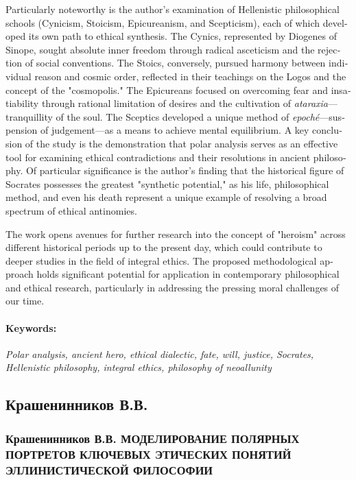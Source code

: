 \begin{english}
    Particularly noteworthy is the author's examination of Hellenistic philosophical schools (Cynicism, Stoicism, Epicureanism, and Scepticism), each of which developed its own path to ethical synthesis. The Cynics, represented by Diogenes of Sinope, sought absolute inner freedom through radical asceticism and the rejection of social conventions. The Stoics, conversely, pursued harmony between individual reason and cosmic order, reflected in their teachings on the Logos and the concept of the "cosmopolis." The Epicureans focused on overcoming fear and insatiability through rational limitation of desires and the cultivation of \textit{ataraxia}—tranquillity of the soul. The Sceptics developed a unique method of \textit{epoché}—suspension of judgement—as a means to achieve mental equilibrium. A key conclusion of the study is the demonstration that polar analysis serves as an effective tool for examining ethical contradictions and their resolutions in ancient philosophy. Of particular significance is the author's finding that the historical figure of Socrates possesses the greatest "synthetic potential," as his life, philosophical method, and even his death represent a unique example of resolving a broad spectrum of ethical antinomies.

    The work opens avenues for further research into the concept of "heroism" across different historical periods up to the present day, which could contribute to deeper studies in the field of integral ethics. The proposed methodological approach holds significant potential for application in contemporary philosophical and ethical research, particularly in addressing the pressing moral challenges of our time.

    \paragraph{Keywords:} {\itshape Polar analysis, ancient hero, ethical dialectic, fate, will, justice, Socrates, Hellenistic philosophy, integral ethics, philosophy of neoallunity}
    \end{english}
\else
    \subsection{Крашенинников В.В.}
    \label{subsec:krasheninnikov-ru}


    \subsubsection{\texorpdfstring{\textbf{Крашенинников В.В. МОДЕЛИРОВАНИЕ ПОЛЯРНЫХ ПОРТРЕТОВ КЛЮЧЕВЫХ ЭТИЧЕСКИХ ПОНЯТИЙ ЭЛЛИНИСТИЧЕСКОЙ ФИЛОСОФИИ}}{Крашенинников В.В. МОДЕЛИРОВАНИЕ ПОЛЯРНЫХ ПОРТРЕТОВ КЛЮЧЕВЫХ ЭТИЧЕСКИХ ПОНЯТИЙ ЭЛЛИНИСТИЧЕСКОЙ ФИЛОСОФИИ}}
    \label{subsubsec:krasheninnikov-title-ru}

